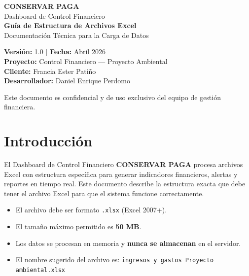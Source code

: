 \documentclass[11pt,a4paper]{article}
\begin{document}
\begin{titlepage}
\centering
\vspace*{3cm}

{\Huge\bfseries\textcolor{verde}{CONSERVAR PAGA}}\\[0.5cm]
{\LARGE\textcolor{gris}{Dashboard de Control Financiero}}\\[2cm]

{\Large\bfseries Guía de Estructura de Archivos Excel}\\[0.3cm]
{\large Documentación Técnica para la Carga de Datos}\\[3cm]

\begin{tcolorbox}[colback=verde!5, colframe=verde, width=12cm]
\centering
\textbf{Versión:} 1.0 \quad | \quad \textbf{Fecha:} Abril 2026\\[0.2cm]
\textbf{Proyecto:} Control Financiero — Proyecto Ambiental\\
\textbf{Cliente:} Francia Ester Patiño\\
\textbf{Desarrollador:} Daniel Enrique Perdomo
\end{tcolorbox}

\vfill
\textcolor{gris}{\small Este documento es confidencial y de uso exclusivo del equipo de gestión financiera.}
\end{titlepage}

\tableofcontents
\newpage

\section{Introducción}

El Dashboard de Control Financiero \textbf{CONSERVAR PAGA} procesa archivos Excel con estructura específica para generar indicadores financieros, alertas y reportes en tiempo real. Este documento describe la estructura exacta que debe tener el archivo Excel para que el sistema funcione correctamente.

\begin{tcolorbox}[colback=azul!5, colframe=azul, title=\textbf{Importante}]
\begin{itemize}[noitemsep]
    \item El archivo debe ser formato \texttt{.xlsx} (Excel 2007+).
    \item El tamaño máximo permitido es \textbf{50 MB}.
    \item Los datos se procesan en memoria y \textbf{nunca se almacenan} en el servidor.
    \item El nombre sugerido del archivo es: \texttt{ingresos y gastos Proyecto ambiental.xlsx}
\end{itemize}
\end{tcolorbox}
\end{document}
